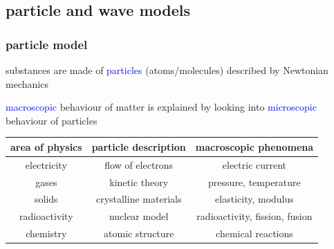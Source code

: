 \documentclass[12pt,xcolor=svgnames,handout]{beamer}
\newcommand{\tightframetitle}[1]{ %
\frametitle{#1}\vspace{-.6\baselineskip}}
\begin{document}
\subsection{particle and wave models}
\begin{frame}
\tightframetitle{particle model}

\begin{block}{}
substances are made of \textcolor{blue}{particles} (atoms/molecules) described by Newtonian mechanics

\textcolor{blue}{macroscopic} behaviour of matter is explained by looking into \textcolor{blue}{microscopic} behaviour of particles
\end{block}

\pause

\begin{block}{}
\centering
\footnotesize
\begin{tabular}{|c|c|c|}
\hline
area of physics & particle description & macroscopic phenomena \\ \hline \hline
electricity & flow of electrons & electric current \\ \hline
gases & kinetic theory & pressure, temperature \\ \hline
solids & crystalline materials & elasticity, modulus \\ \hline
radioactivity & nuclear model & radioactivity, fission, fusion \\ \hline
chemistry & atomic structure & chemical reactions \\ \hline
\end{tabular}
\end{block}

\end{frame}

\end{document}
